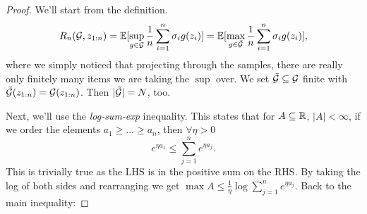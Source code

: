 \documentclass[twoside]{article}
\newcommand{\zn}{z_{1:n}}
\newcommand{\supg}{\sup_{g \in \cG}}
\begin{document}
\begin{proof}
We'll start from the definition.
\begin{align*}
    R_n(\cG, \zn) = \EE{ \supg \frac1n \sum_{i=1}^n \sigma_i g(z_i) } 
    = \EE{ \max_{g \in \tilde{\cG}} \frac1n \sum_{i=1}^n \sigma_i g(z_i) }, 
\end{align*}
where we simply noticed that projecting through the samples, there are really only finitely many items we are taking the $\sup$ over. We set $\tilde{\mathcal{G}} \subseteq \mathcal{G}$ finite with $\tilde{\cG}(\zn) = \cG(\zn)$. Then $|\tilde{\mathcal{G}}| = N$, too.

Next, we'll use the \textit{log-sum-exp} inequality. This states that for $A \subseteq \mathbb{R}$, $|A| < \infty$, if we order the elements $a_1 \geq \dotsc \geq a_n$, then $\forall \eta > 0$
\begin{equation*}
     e^{\eta a_1} \leq \sum_{j=1}^n e^{\eta a_j}.
\end{equation*}
This is trivially true as the LHS is in the positive sum on the RHS.
By taking the log of both sides and rearranging we get $\max A \leq \frac1\eta \log \sum_{j=1}^n e^{\eta a_j}$. Back to the main inequality:


\end{proof}
\end{document}
